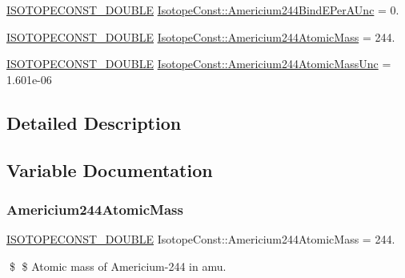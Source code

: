 \begin{DoxyCompactItemize}
\mbox{\hyperlink{group___isotope_const-_macros_ga8f45a7272ce02c0b4c65c44636ed719a}{I\+S\+O\+T\+O\+P\+E\+C\+O\+N\+S\+T\+\_\+\+D\+O\+U\+B\+LE}} \mbox{\hyperlink{group___isotope_const-_americium-_am244_ga59b1a25937981a164da11b4b2f396b95}{Isotope\+Const\+::\+Americium244\+Bind\+E\+Per\+A\+Unc}} = 0.
\item 
\mbox{\hyperlink{group___isotope_const-_macros_ga8f45a7272ce02c0b4c65c44636ed719a}{I\+S\+O\+T\+O\+P\+E\+C\+O\+N\+S\+T\+\_\+\+D\+O\+U\+B\+LE}} \mbox{\hyperlink{group___isotope_const-_americium-_am244_gab5b4e8df8cb7b5e8b8a4c7d51e775599}{Isotope\+Const\+::\+Americium244\+Atomic\+Mass}} = 244.
\item 
\mbox{\hyperlink{group___isotope_const-_macros_ga8f45a7272ce02c0b4c65c44636ed719a}{I\+S\+O\+T\+O\+P\+E\+C\+O\+N\+S\+T\+\_\+\+D\+O\+U\+B\+LE}} \mbox{\hyperlink{group___isotope_const-_americium-_am244_ga36f05ad17e4c96473033e92037801ac0}{Isotope\+Const\+::\+Americium244\+Atomic\+Mass\+Unc}} = 1.\+601e-\/06
\end{DoxyCompactItemize}


\subsection{Detailed Description}


\subsection{Variable Documentation}
\mbox{\label{group___isotope_const-_americium-_am244_gab5b4e8df8cb7b5e8b8a4c7d51e775599}} 
\subsubsection{\texorpdfstring{Americium244\+Atomic\+Mass}{Americium244AtomicMass}}
{\footnotesize\ttfamily \mbox{\hyperlink{group___isotope_const-_macros_ga8f45a7272ce02c0b4c65c44636ed719a}{I\+S\+O\+T\+O\+P\+E\+C\+O\+N\+S\+T\+\_\+\+D\+O\+U\+B\+LE}} Isotope\+Const\+::\+Americium244\+Atomic\+Mass = 244.}

\$ \$ Atomic mass of Americium-\/244 in amu. \mbox{\label{group___isotope_const-_americium-_am244_ga36f05ad17e4c96473033e92037801ac0}} 
